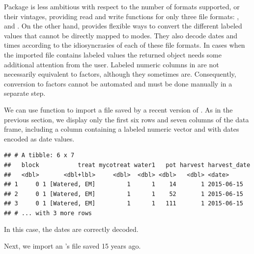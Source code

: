 \documentclass[krantz2]{krantz}\usepackage{knitr}
\begin{document}
Package  is less ambitious with respect to the number of formats supported, or their vintages, providing read and write functions for only three file formats: ,  and . On the other hand,  provides flexible ways to convert the different labeled values that cannot be directly mapped to \Rlang modes. They also decode dates and times according to the idiosyncrasies of each of these file formats. In cases when the imported file contains labeled values the returned  object needs some additional attention from the user. Labeled numeric columns in  are not necessarily equivalent to factors, although they sometimes are. Consequently, conversion to factors cannot be automated and must be done manually in a separate step.

We can use function  to import a  file saved by a recent version of . As in the previous section, we display only the first six rows and seven columns of the data frame, including a column  containing a labeled numeric vector and  with dates encoded as \Rlang date values.

\begin{knitrout}\footnotesize
{}\color{fgcolor}\begin{kframe}
\begin{alltt}
 \hlkwb{<-} \hlstd{(} \hlstd{=} \hlstd{)}
\hlstd{my_spss.tb[}\hlopt{:}\hlstd{,} \hlstd{(}\hlopt{:}\hlstd{,} \hlstd{)]}
\end{alltt}
\begin{verbatim}
## # A tibble: 6 x 7
##   block           treat mycotreat water1   pot harvest harvest_date
##   <dbl>       <dbl+lbl>     <dbl>  <dbl> <dbl>   <dbl> <date>
## 1     0 1 [Watered, EM]         1      1    14       1 2015-06-15
## 2     0 1 [Watered, EM]         1      1    52       1 2015-06-15
## 3     0 1 [Watered, EM]         1      1   111       1 2015-06-15
## # ... with 3 more rows
\end{verbatim}
\end{kframe}
\end{knitrout}

In this case, the dates are correctly decoded.

Next, we import an 's  file saved 15 years ago.
\end{document}
